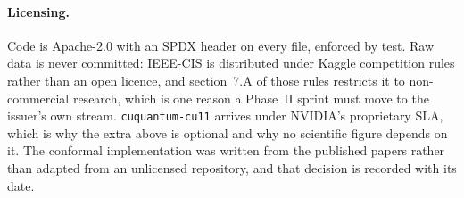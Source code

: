 \paragraph{Licensing.} Code is Apache-2.0 with an SPDX header on every file, enforced by test.
Raw data is never committed: IEEE-CIS is distributed under Kaggle competition rules rather than
an open licence, and section~7.A of those rules restricts it to non-commercial research, which
is one reason a Phase~II sprint must move to the issuer's own stream.
\texttt{cuquantum-cu11} arrives under NVIDIA's proprietary SLA, which is why the extra above
is optional and why no scientific figure depends on it. The conformal implementation was
written from the published papers rather than adapted from an unlicensed repository, and that
decision is recorded with its date.
